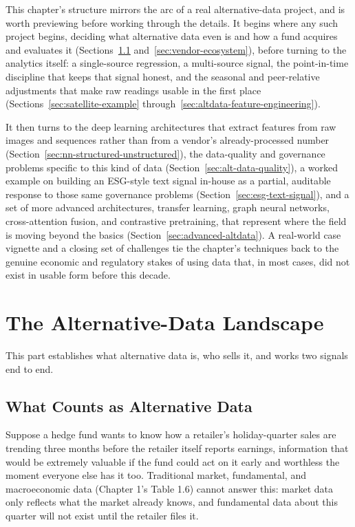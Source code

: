 \documentclass[../ai_in_finance]{subfiles}
\begin{document}
This chapter's structure mirrors the arc of a real alternative-data project, and is worth previewing before working through the details. It begins where any such project begins, deciding what alternative data even is and how a fund acquires and evaluates it (Sections~\ref{sec:alt-data-sources} and~\ref{sec:vendor-ecosystem}), before turning to the analytics itself: a single-source regression, a multi-source signal, the point-in-time discipline that keeps that signal honest, and the seasonal and peer-relative adjustments that make raw readings usable in the first place (Sections~\ref{sec:satellite-example} through~\ref{sec:altdata-feature-engineering}).

It then turns to the deep learning architectures that extract features from raw images and sequences rather than from a vendor's already-processed number (Section~\ref{sec:nn-structured-unstructured}), the data-quality and governance problems specific to this kind of data (Section~\ref{sec:alt-data-quality}), a worked example on building an ESG-style text signal in-house as a partial, auditable response to those same governance problems (Section~\ref{sec:esg-text-signal}), and a set of more advanced architectures, transfer learning, graph neural networks, cross-attention fusion, and contrastive pretraining, that represent where the field is moving beyond the basics (Section~\ref{sec:advanced-altdata}). A real-world case vignette and a closing set of challenges tie the chapter's techniques back to the genuine economic and regulatory stakes of using data that, in most cases, did not exist in usable form before this decade.

\section{The Alternative-Data Landscape}

This part establishes what alternative data is, who sells it, and works two signals end to end.

\subsection{What Counts as Alternative Data}
\label{sec:alt-data-sources}

Suppose a hedge fund wants to know how a retailer's holiday-quarter sales are trending three months before the retailer itself reports earnings, information that would be extremely valuable if the fund could act on it early and worthless the moment everyone else has it too. Traditional market, fundamental, and macroeconomic data (Chapter 1's Table 1.6) cannot answer this: market data only reflects what the market already knows, and fundamental data about this quarter will not exist until the retailer files it.
\end{document}
